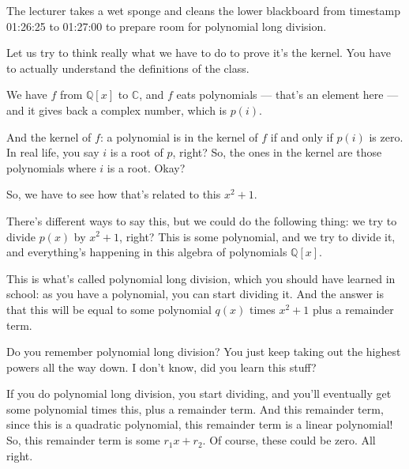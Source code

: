 \begin{note}
The lecturer takes a wet sponge and cleans the lower blackboard from timestamp 01:26:25 to 01:27:00 to prepare room for polynomial long division.
\end{note}

\begin{speech}[01:26:25 - 01:28:30]
Let us try to think really what we have to do to prove it's the kernel. You have to actually understand the definitions of the class. 

We have $f$ from $\mathbb{Q}[x]$ to $\mathbb{C}$,  and $f$ eats polynomials --- that's an element here --- and it gives back a complex number, which is $p(i)$.  

And the kernel of $f$: a polynomial is in the kernel of $f$ if and only if $p(i)$ is zero.  In real life, you say $i$ is a root of $p$,  right? So, the ones in the kernel are those polynomials where $i$ is a root. Okay? 

So, we have to see how that's related to this $x^2 + 1$. 

There's different ways to say this, but we could do the following thing: we try to divide $p(x)$ by $x^2 + 1$,  right? This is some polynomial, and we try to divide it, and everything's happening in this algebra of polynomials $\mathbb{Q}[x]$.  

This is what's called polynomial long division, which you should have learned in school: as you have a polynomial, you can start dividing it. And the answer is that this will be equal to some polynomial $q(x)$ times $x^2 + 1$ plus a remainder term.  

Do you remember polynomial long division? You just keep taking out the highest powers all the way down. I don't know, did you learn this stuff? 

If you do polynomial long division, you start dividing, and you'll eventually get some polynomial times this, plus a remainder term. And this remainder term, since this is a quadratic polynomial, this remainder term is a linear polynomial!  So, this remainder term is some $r_1 x + r_2$.  Of course, these could be zero. All right.
\end{speech}

